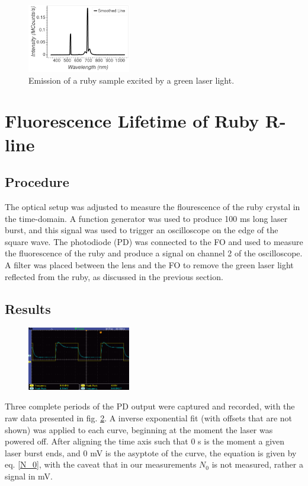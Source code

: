 \documentclass[aps,prl,reprint]{revtex4-2}
\begin{document}
\begin{figure}[h]
	\includegraphics[width=0.4\textwidth]{../Images/l3_D_a.png}
	\caption{\label{emission} Emission of a ruby sample excited by a green laser 
	light.}
\end{figure}

\section{Fluorescence Lifetime of Ruby R-line}

\subsection{Procedure}
The optical setup was adjusted to measure the flourescence of the ruby crystal in
the time-domain. A function generator was used to produce 100 ms long laser burst,
and this signal was used to trigger an oscilloscope on the edge of the square wave. The
photodiode (PD) was connected to the FO and used to measure the fluorescence of the 
ruby and produce a signal on channel 2 of the oscilloscope. A filter was placed 
between the lens and the FO to remove the green laser light reflected from the ruby,
as discussed in the previous section. 

\subsection{Results}

\begin{figure}[h]
	\includegraphics[width=0.4\textwidth]{../Images/l3_E_Oscilloscope.png}
	\caption{\label{scope}}
\end{figure}

Three complete periods of the PD output were captured and recorded, with the raw
data presented in fig. \ref{scope}. A inverse exponential fit (with offsets that are
not shown) was applied to each curve, beginning at the moment the laser was powered
off. After aligning the time axis such that 0 s is the moment a given laser burst ends,
and 0 mV is the asyptote of the curve, the equation is given by eq. \ref{N_0}, with
the caveat that in our measurements $N_0$ is not measured, rather a signal in mV.
\end{document}
